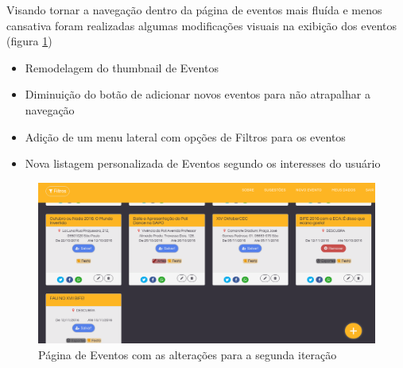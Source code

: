 \par Visando tornar a navegação dentro da página de eventos mais fluída e menos cansativa foram realizadas algumas modificações visuais na exibição dos eventos (figura \ref{fig:events_pagev2})
\begin{itemize}
\item Remodelagem do thumbnail de Eventos
\item Diminuição do botão de adicionar novos eventos para não atrapalhar a navegação
\item Adição de um menu lateral com opções de Filtros para os eventos
\item Nova listagem personalizada de Eventos segundo os interesses do usuário
\end{itemize}
        \begin{figure}[htb]
		\includegraphics[width=15cm]{figuras/events_pagev2}
		\caption{\label{fig:events_pagev2} Página de Eventos com as alterações para a segunda iteração}
		\end{figure}

